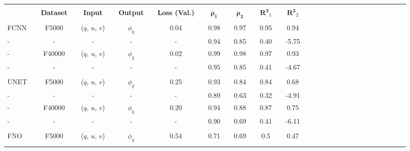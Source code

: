 \bgroup
\def\arraystretch{1.5}
\begin{table}[H]
\hspace{-0.70cm}
\begin{tabular}{llclclclclclclclclclclclclclclcl}
\Xhline{1.5pt}\\[-1.5em]
\textbf{} &  & \textbf{Dataset} &  & \textbf{Input} &  & \textbf{Output} &  & \textbf{Loss (Val.)} &  & $\boldsymbol{\rho_{1}}$ &  & $\boldsymbol{\rho_{2}}$ &  & $\boldsymbol{R^2}_1$ &  & $\boldsymbol{R^2}_2$ \\[0.4em] 
\cline{1-1} \cline{3-3} \cline{5-5} \cline{7-7} \cline{9-9} \cline{11-11} \cline{13-13} \cline{15-15} \cline{17-17} \\[-1.4em]
FCNN        &  & F5000           &  & ($q$, $u$, $v$)  &  & $\phi_q$ &  & 0.04          &  & 0.98           &  & 0.97           &  & 0.95             &  & 0.94         \\ \rowcolor{Gray}
-     		&  & -               &  & -				   &  & -        &  & -              &  & 0.94           &  & 0.85           &  & 0.40             &  & -5.75         \\  
-           &  & F40000          &  & ($q$, $u$, $v$)  &  & $\phi_q$ &  & 0.02          &  & 0.99           &  & 0.98           &  & 0.97         &  & 0.93          \\ \rowcolor{Gray}
-     		&  & -               &  & -				   &  & -        &  & -              &  & 0.95           &  & 0.85           &  & 0.41         &  & -4.67             \\  
\hline \\[-1.4em]
UNET        &  & F5000           &  & ($q$, $u$, $v$)  &  & $\phi_q$ &  & 0.25          &  & 0.93           &  & 0.84           &  & 0.84             &  & 0.68         \\ \rowcolor{Gray}
-     		&  & -               &  & -				   &  & -        &  & -              &  & 0.89           &  & 0.63           &  & 0.32             &  & -4.91         \\  
-           &  & F40000          &  & ($q$, $u$, $v$)  &  & $\phi_q$ &  & 0.20          &  & 0.94           &  & 0.88           &  & 0.87         &  & 0.75          \\ \rowcolor{Gray}
-     		&  & -               &  & -				   &  & -        &  & -              &  & 0.90           &  & 0.69           &  & 0.41         &  & -6.11             \\  
\hline \\[-1.4em]
FNO         &  & F5000           &  & ($q$, $u$, $v$)  &  & $\phi_q$ &  & 0.54          &  & 0.71           &  & 0.69           &  & 0.5             &  & 0.47         \\ \rowcolor{Gray}

\end{tabular}
\end{table}
